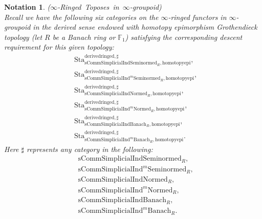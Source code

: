 \documentclass[12pt]{book}
\newtheorem{notation}{Notation}
\begin{document}
\begin{notation}\mbox{\rm{($\infty$-Ringed Toposes in $\infty$-groupoid)}}\\
Recall we have the following six categories on the $\infty$-ringed functors in $\infty$-groupoid in the derived sense endowed with homotopy epimorphism Grothendieck topology (let $R$ be a Banach ring or $\mathbb{F}_1$) satisfying the corresponding descent requirement for this given topology:
\begin{align}
&\mathrm{Sta}^\mathrm{derivedringed,\sharp}_{\mathrm{sComm}\mathrm{Simplicial}\mathrm{Ind}\mathrm{Seminormed}_R,\mathrm{homotopyepi}},\\
&\mathrm{Sta}^\mathrm{derivedringed,\sharp}_{\mathrm{sComm}\mathrm{Simplicial}\mathrm{Ind}^m\mathrm{Seminormed}_R,\mathrm{homotopyepi}},\\
&\mathrm{Sta}^\mathrm{derivedringed,\sharp}_{\mathrm{sComm}\mathrm{Simplicial}\mathrm{Ind}\mathrm{Normed}_R,\mathrm{homotopyepi}},\\
&\mathrm{Sta}^\mathrm{derivedringed,\sharp}_{\mathrm{sComm}\mathrm{Simplicial}\mathrm{Ind}^m\mathrm{Normed}_R,\mathrm{homotopyepi}},\\
&\mathrm{Sta}^\mathrm{derivedringed,\sharp}_{\mathrm{sComm}\mathrm{Simplicial}\mathrm{Ind}\mathrm{Banach}_R,\mathrm{homotopyepi}},\\
&\mathrm{Sta}^\mathrm{derivedringed,\sharp}_{\mathrm{sComm}\mathrm{Simplicial}\mathrm{Ind}^m\mathrm{Banach}_R,\mathrm{homotopyepi}}.	
\end{align}
Here $\sharp$ represents any category in the following:
\begin{align}
&\mathrm{sComm}\mathrm{Simplicial}\mathrm{Ind}\mathrm{Seminormed}_R,\\
&\mathrm{sComm}\mathrm{Simplicial}\mathrm{Ind}^m\mathrm{Seminormed}_R,\\
&\mathrm{sComm}\mathrm{Simplicial}\mathrm{Ind}\mathrm{Normed}_R,\\
&\mathrm{sComm}\mathrm{Simplicial}\mathrm{Ind}^m\mathrm{Normed}_R,\\
&\mathrm{sComm}\mathrm{Simplicial}\mathrm{Ind}\mathrm{Banach}_R,\\
&\mathrm{sComm}\mathrm{Simplicial}\mathrm{Ind}^m\mathrm{Banach}_R.	
\end{align}	
\end{notation}
\end{document}
